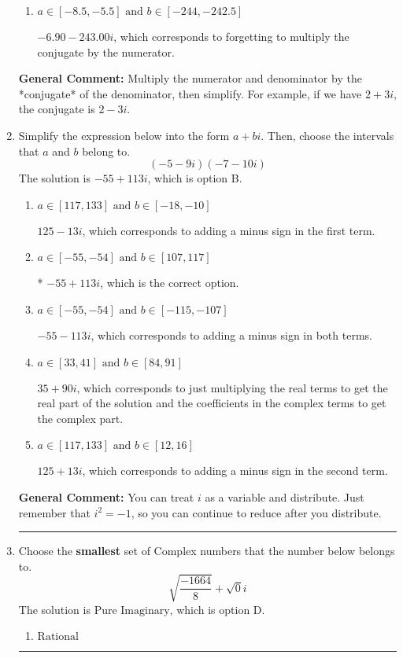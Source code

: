\documentclass{extbook}[14pt]
\newcommand{\litem}[1]{\item #1

\rule{\textwidth}{0.4pt}}
\begin{document}
\begin{enumerate}
{\begin{enumerate}[label=\Alph*.]
* $-6.90  - 24.30 i$, which is the correct option.
\item \( a \in [-8.5, -5.5] \text{ and } b \in [-244, -242.5] \)

 $-6.90  - 243.00 i$, which corresponds to forgetting to multiply the conjugate by the numerator.
\end{enumerate}

\textbf{General Comment:} Multiply the numerator and denominator by the *conjugate* of the denominator, then simplify. For example, if we have $2+3i$, the conjugate is $2-3i$.
}
\litem{
Simplify the expression below into the form $a+bi$. Then, choose the intervals that $a$ and $b$ belong to.
\[ (-5 - 9 i)(-7 - 10 i) \]The solution is \( -55 + 113 i \), which is option B.\begin{enumerate}[label=\Alph*.]
\item \( a \in [117, 133] \text{ and } b \in [-18, -10] \)

 $125 - 13 i$, which corresponds to adding a minus sign in the first term.
\item \( a \in [-55, -54] \text{ and } b \in [107, 117] \)

* $-55 + 113 i$, which is the correct option.
\item \( a \in [-55, -54] \text{ and } b \in [-115, -107] \)

 $-55 - 113 i$, which corresponds to adding a minus sign in both terms.
\item \( a \in [33, 41] \text{ and } b \in [84, 91] \)

 $35 + 90 i$, which corresponds to just multiplying the real terms to get the real part of the solution and the coefficients in the complex terms to get the complex part.
\item \( a \in [117, 133] \text{ and } b \in [12, 16] \)

 $125 + 13 i$, which corresponds to adding a minus sign in the second term.
\end{enumerate}

\textbf{General Comment:} You can treat $i$ as a variable and distribute. Just remember that $i^2=-1$, so you can continue to reduce after you distribute.
}
\litem{
Choose the \textbf{smallest} set of Complex numbers that the number below belongs to.
\[ \sqrt{\frac{-1664}{8}}+\sqrt{0}i \]The solution is \( \text{Pure Imaginary} \), which is option D.\begin{enumerate}[label=\Alph*.]
\item \( \text{Rational} \)


\end{enumerate}}
\end{enumerate}
\end{document}
